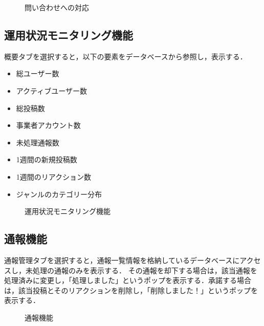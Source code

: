 \begin{figure}[H]
    \centering
    
    \caption{問い合わせへの対応}
    \label{fig:support_request}
\end{figure}
\subsection{運用状況モニタリング機能}

概要タブを選択すると，以下の要素をデータベースから参照し，表示する．
\begin{itemize}
    \item 総ユーザー数
    \item アクティブユーザー数
    \item 総投稿数
    \item 事業者アカウント数
    \item 未処理通報数
    \item 1週間の新規投稿数
    \item 1週間のリアクション数
    \item ジャンルのカテゴリー分布
\end{itemize}

\begin{figure}[H]
    \centering
    
    \caption{運用状況モニタリング機能}
    \label{fig:monitoring}
\end{figure}

\subsection{通報機能}
通報管理タブを選択すると，通報一覧情報を格納しているデータベースにアクセスし，未処理の通報のみを表示する．
その通報を却下する場合は，該当通報を処理済みに変更し，「処理しました」というポップを表示する．承諾する場合は，該当投稿とそのリアクションを削除し，「削除しました！」というポップを表示する．

\begin{figure}[H]
    \centering
    
    \caption{通報機能}
    \label{fig:report}
\end{figure}